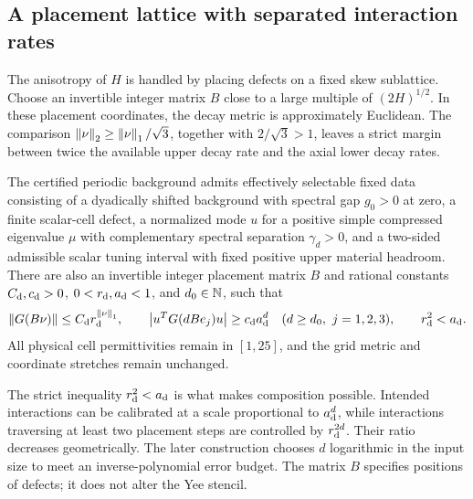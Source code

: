 \subsection{A placement lattice with separated interaction rates}

The anisotropy of \(H\) is handled by placing defects on a fixed skew
sublattice. Choose an invertible integer matrix \(B\) close to a large
multiple of \((2H)^{1/2}\). In these placement coordinates, the decay
metric is approximately Euclidean. The comparison
\(\left\lVert \nu\right\rVert_2\ge\left\lVert \nu\right\rVert_1/\sqrt3\), together with
\(2/\sqrt3>1\), leaves a strict margin between twice the available
upper decay rate and the axial lower decay rates.

\begin{samepage}
\begin{proposition}
\label{d:prop:physical-platform}
The certified periodic background admits effectively selectable fixed
data consisting of a dyadically shifted background with spectral gap
\(g_0>0\) at zero, a finite scalar-cell defect, a normalized mode \(u\)
for a positive simple compressed eigenvalue \(\mu\) with complementary
spectral separation \(\gamma_d>0\), and a two-sided admissible scalar
tuning interval with fixed positive upper material headroom.
There are also an invertible integer placement matrix \(B\)
and rational constants \(C_{\rm d},c_{\rm d}>0\), \(0<r_{\rm d},a_{\rm d}<1\), and \(d_0\in\mathbb N\), such that
\begin{equation}
 \left\lVert G(B\nu)\right\rVert\le C_{\rm d}r_{\rm d}^{\left\lVert \nu\right\rVert_1},
 \qquad
 \left\lvert u^TG(dBe_j)u\right\rvert\ge c_{\rm d}a_{\rm d}^d
 \quad (d\ge d_0,\ j=1,2,3),
 \qquad r_{\rm d}^2<a_{\rm d}.
 \label{d:eq:physical-platform-bounds}
\end{equation}
All physical cell permittivities remain in \([1,25]\), and the grid metric
and coordinate stretches remain unchanged.
\end{proposition}
\end{samepage}

The strict inequality \(r_{\rm d}^2<a_{\rm d}\) is what makes composition possible.
Intended interactions can be calibrated at a scale proportional to
\(a_{\rm d}^d\), while interactions traversing at least two placement steps are
controlled by \(r_{\rm d}^{2d}\). Their ratio decreases geometrically. The
later construction chooses \(d\) logarithmic in the input size to meet an
inverse-polynomial error budget. The matrix \(B\) specifies positions of
defects; it does not alter the Yee stencil.

